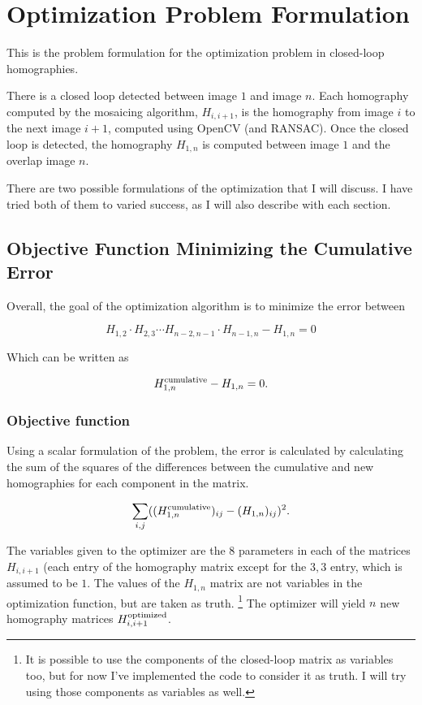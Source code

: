 \documentclass{article}
\begin{document}
\section{Optimization Problem Formulation}

This is the problem formulation for the optimization problem in closed-loop
homographies.

There is a closed loop detected between image $1$ and image $n$. Each
homography computed by the mosaicing algorithm, $H_{i, i + 1}$, is the
homography from image $i$ to the next image $i + 1$, computed using OpenCV (and
RANSAC). Once the closed loop is detected, the homography $H_{1, n}$ is
computed between image $1$ and the overlap image $n$. 

There are two possible formulations of the optimization that I will discuss. I
have tried both of them to varied success, as I will also describe with each
section. 

\subsection{Objective Function Minimizing the Cumulative Error}

Overall, the goal of the optimization algorithm is to minimize the error
between
 
\[H_{1, 2} \cdot H_{2, 3} \cdots H_{n - 2, n - 1} \cdot H_{n - 1, n} - H_{1, n} = 0\]

Which can be written as

\[H_{1, n}^{\textnormal{cumulative}} - H_{1, n} = 0.\]

\subsubsection{Objective function}

Using a scalar formulation of the problem, the error is calculated by
calculating the sum of the squares of the differences between the
cumulative and new homographies for each component in the matrix.

\[\sum_{i,j} ((H_{1, n}^{\textnormal{cumulative}})_{ij} - (H_{1, n})_{ij})^2.\]

The variables given to the optimizer are the $8$ parameters in each of the
matrices $H_{i, i + 1}$ (each entry of the homography matrix except for the $3,
3$ entry, which is assumed to be $1$. The values of the $H_{1, n}$ matrix are
not variables in the optimization function, but are taken as truth.
\footnote{It is possible to use the components of the closed-loop matrix as
variables too, but for now I've implemented the code to consider it as truth. I
will try using those components as variables as well.} The optimizer will yield
$n$ new homography matrices $H_{i, i+1}^{\textnormal{optimized}}$. 
\end{document}
